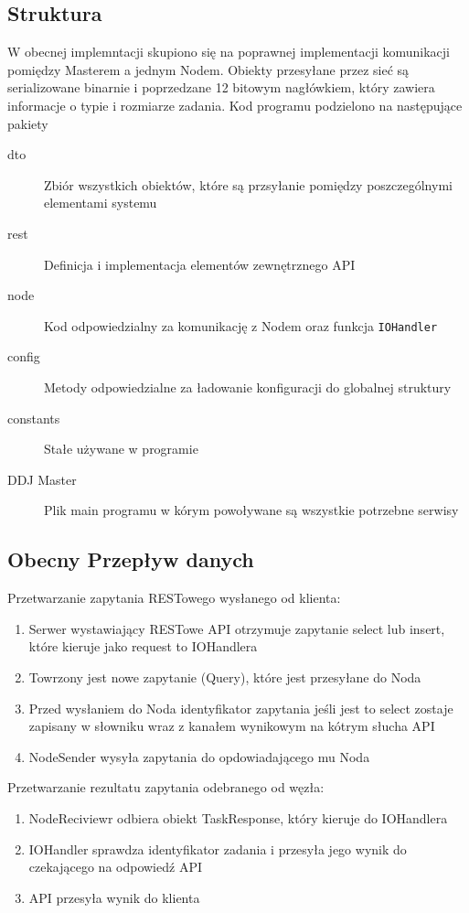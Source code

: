 \documentclass[paper=a4, fontsize=11pt]{scrartcl} %
\numberwithin{equation}{section} %
\numberwithin{figure}{section} %
\numberwithin{table}{section} %
\begin{document}
	\subsection{Struktura}
		W obecnej implemntacji skupiono się na poprawnej implementacji komunikacji pomiędzy Masterem a jednym Nodem.
		Obiekty przesyłane przez sieć są serializowane binarnie i poprzedzane 12 bitowym nagłówkiem, który zawiera informacje
		o typie i rozmiarze zadania. Kod programu podzielono na następujące pakiety
		\begin{description}
			\item[dto] Zbiór wszystkich obiektów, które są przsyłanie pomiędzy poszczególnymi elementami systemu
			\item[rest] Definicja i implementacja elementów zewnętrznego API
			\item[node] Kod odpowiedzialny za komunikację z Nodem oraz funkcja \texttt{IOHandler}
			\item[config] Metody odpowiedzialne za ładowanie konfiguracji do globalnej struktury
			\item[constants] Stałe używane w programie
			\item[DDJ Master] Plik main programu w kórym powoływane są wszystkie potrzebne serwisy
		\end{description}

	\subsection{Obecny Przepływ danych}
		Przetwarzanie zapytania RESTowego wysłanego od klienta:
		\begin{enumerate}
			\item Serwer wystawiający RESTowe API otrzymuje zapytanie select lub insert, które kieruje jako request to IOHandlera
			\item Towrzony jest nowe zapytanie (Query), które jest przesyłane do Noda
			\item Przed wysłaniem do Noda identyfikator zapytania jeśli jest to select zostaje zapisany w słowniku wraz z kanałem 
			wynikowym na kótrym słucha API
			\item NodeSender wysyła zapytania do opdowiadającego mu Noda
		\end{enumerate}
		Przetwarzanie rezultatu zapytania odebranego od węzła:
		\begin{enumerate}
			\item NodeReciviewr odbiera obiekt TaskResponse, który kieruje do IOHandlera
			\item IOHandler sprawdza identyfikator zadania i przesyła jego wynik do czekającego na odpowiedź API
			\item API przesyła wynik do klienta
		\end{enumerate}
\end{document}

